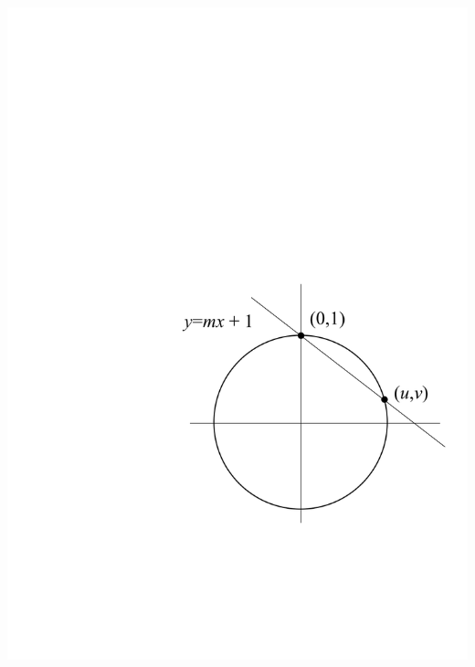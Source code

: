 \documentclass[11pt]{amsart}
\begin{document}
\begin{center}
\includegraphics{pics/pythag-triples}
\end{center}
\end{document}
